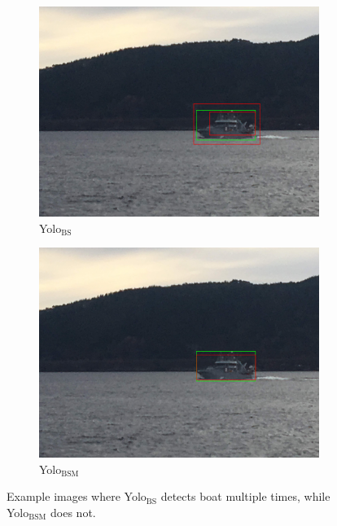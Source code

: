 \begin{figure}[h!]
\begin{subfigure}{.5\textwidth}
  \centering
  \includegraphics[width=0.8\linewidth]{results/case_tr_moor/yolo12/yolo1/2better/IMG_2269.jpg}
  \caption{Yolo$_{\text{BS}}$}
\end{subfigure}%
\begin{subfigure}{.5\textwidth}
  \centering
  \includegraphics[width=.8\linewidth]{results/case_tr_moor/yolo12/yolo2/2better/IMG_2269.jpg}
  \caption{Yolo$_{\text{BSM}}$}
\end{subfigure}
\caption{Example images where Yolo$_{\text{BS}}$ detects boat multiple times, while Yolo$_{\text{BSM}}$ does not.}
\label{img:yolo1_multi_detect}
\end{figure}
